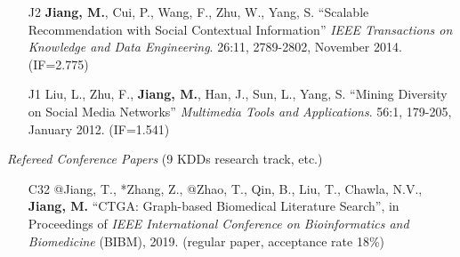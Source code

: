 \documentclass[10pt]{article}
\newenvironment{myindentpar}[1]%
{\begin{list}{}%
         {\setlength{\leftmargin}{#1}}%
         \item[]%
}
{\end{list}}
\newcounter{list}
\begin{document}
\begin{myindentpar}{0.00cm}
\begin{enumerate}[leftmargin=.5cm]
\vspace{-0.1cm}
\vspace{0.15cm}

\item[J2] \textbf{Jiang, M.}, Cui, P., Wang, F., Zhu, W., Yang, S. ``Scalable Recommendation with Social Contextual Information'' \textit{IEEE Transactions on Knowledge and Data Engineering}. 26:11, 2789-2802, November 2014. (IF=2.775)

\vspace{-0.1cm}
\vspace{0.15cm}

\item[J1] Liu, L., Zhu, F., \textbf{Jiang, M.}, Han, J., Sun, L., Yang, S. ``Mining Diversity on Social Media Networks'' \textit{Multimedia Tools and Applications}. 56:1, 179-205, January 2012. (IF=1.541)

\vspace{-0.1cm}

\end{enumerate}

\hspace{-0.25cm}\emph{Refereed Conference Papers} (9 KDDs research track, etc.)

\begin{enumerate}[leftmargin=.5cm]

\item[C32] @Jiang, T., *Zhang, Z., @Zhao, T., Qin, B., Liu, T., Chawla, N.V., \textbf{Jiang, M.} ``CTGA: Graph-based Biomedical Literature Search'', in Proceedings of \textit{IEEE International Conference on Bioinformatics and Biomedicine} (BIBM), 2019. (regular paper, acceptance rate 18\%)

\vspace{-0.1cm}


\end{enumerate}
\end{myindentpar}
\end{document}
